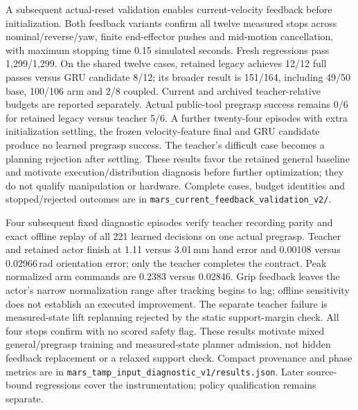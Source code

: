 A subsequent actual-reset validation enables current-velocity feedback before
initialization. Both feedback variants confirm all twelve measured stops across
nominal/reverse/yaw, finite end-effector pushes and mid-motion cancellation,
with maximum stopping time 0.15 simulated seconds. Fresh regressions pass
1,299/1,299. On the shared twelve cases, retained legacy achieves 12/12 full
passes versus GRU candidate 8/12; its broader result is 151/164, including
49/50 base, 100/106 arm and 2/8 coupled. Current and archived teacher-relative
budgets are reported separately. Actual public-tool pregrasp success remains
0/6 for retained legacy versus teacher 5/6. A further twenty-four episodes with
extra initialization settling, the frozen velocity-feature final and GRU
candidate produce no learned pregrasp success. The teacher's difficult case
becomes a planning rejection after settling. These results favor the retained
general baseline and motivate execution/distribution diagnosis before further
optimization; they do not qualify manipulation or hardware. Complete cases,
budget identities and stopped/rejected outcomes are in
\texttt{mars\_current\_feedback\_validation\_v2/}.

Four subsequent fixed diagnostic episodes verify teacher recording parity and
exact offline replay of all 221 learned decisions on one actual pregrasp.
Teacher and retained actor finish at 1.11 versus 3.01\,mm hand error and
0.00108 versus 0.02966\,rad orientation error; only the teacher completes the
contract. Peak normalized arm commands are 0.2383 versus 0.02846. Grip feedback
leaves the actor's narrow normalization range after tracking begins to lag;
offline sensitivity does not establish an executed improvement. The separate
teacher failure is measured-state lift replanning rejected by the static
support-margin check. All four stops confirm with no scored safety flag.
These results motivate mixed general/pregrasp training and measured-state
planner admission, not hidden feedback replacement or a relaxed support check.
Compact provenance and phase metrics are in
\texttt{mars\_tamp\_input\_diagnostic\_v1/results.json}. Later source-bound
regressions cover the instrumentation; policy qualification remains separate.

